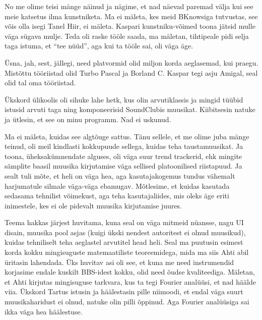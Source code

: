 No me olime teisi mänge näinud ja nägime, et nad näevad paremad välja kui see 
meie katsetus ilma kunstniketa. Ma ei mäleta, kes meid  
BKnowsiga tutvustas, see võis olla isegi Tanel 
Hiir, ei mäleta. Kaspari kunstniku-võimed toona jätsid 
mulle väga sügava mulje. Teda oli raske tööle saada, ma mäletan, tihtipeale 
pidi selja taga istuma, et \enquote{tee nüüd}, aga kui ta tööle sai, oli väga 
äge. 


Üsna, jah, sest, jällegi, need platvormid olid miljon korda aeglasemad, kui 
praegu. Mistõttu tööriistad olid Turbo Pascal ja 
Borland C. Kaspar tegi asju Amigal, seal olid tal oma 
tööriistad.


Ükskord ülikoolis oli sihuke lahe hetk, kus olin arvutiklassis ja mingid tüübid 
istusid arvuti taga ning komponeerisid  SoundClubis muusikat. 
Kiibitsesin natuke ja ütlesin, et see on minu programm. Nad ei uskunud. 

Ma ei mäleta, kuidas see algtõuge sattus. Tänu sellele, et me olime juba mänge 
teinud, oli meil kindlasti kokkupuude sellega, kuidas teha taustamuusikat. Ja 
toona, üheksakümnendate alguses, oli väga suur trend trackerid, ehk mingite 
sämplite baasil muusika kirjutamise väga sellised platoonilised riistapuud. Ja 
sealt tuli mõte, et  heli on väga hea,  aga kasutajakogemus tundus  vähemalt 
harjumatule silmale väga-väga ebamugav. Mõtlesime, et kuidas kasutada sedasama 
tehnilist võimekust, aga teha  kasutajaliides, mis oleks äge eriti inimestele, 
kes ei ole pidevalt muusika kirjutamise juures.

Teema hakkas järjest huvitama, kuna seal on väga mitmeid nüansse, nagu UI 
disain, muusika pool asjas (kuigi ükski nendest autoritest ei olnud muusikud), 
kuidas tehniliselt teha aeglastel arvutitel head heli. Seal ma puutusin esimest 
korda kokku mingisuguste matemaatiliste teoreemidega, mida ma siis 
Ahti abil üritasin lahendada. Üks huvitav asi oli see, 
et kuna me need instrumendid korjasime endale kuskilt BBS-idest kokku, olid 
need õudse kvaliteediga. Mäletan, et Ahti kirjutas mingisuguse tarkvara, kus ta 
tegi Fourier analüüsi, et nad häälde viia. Ükskord Tartus istusin ja 
häälestasin pille niimoodi, et endal väga suurt muusikaharidust ei olnud, 
natuke olin pilli õppinud. Aga Fourier analüüsiga sai ikka väga hea häälestuse. 


